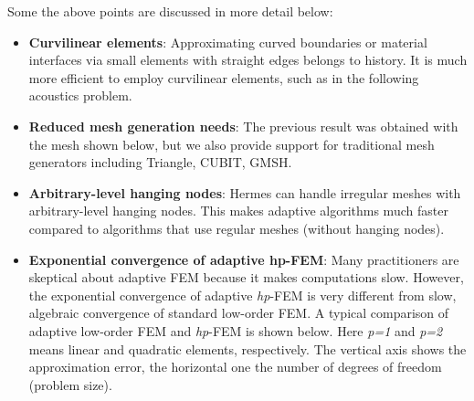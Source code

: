 \documentclass[a4paper,0pt,english]{sphinxmanual}
\let\origfigure=\figure
\renewenvironment{figure}[6]{
\origfigure[H]}
{\endlist}
\begin{document}
Some the above points are discussed in more detail below:
\begin{itemize}
\item {} 
\textbf{Curvilinear elements}: Approximating curved boundaries or material interfaces via small elements with straight edges belongs to history. It is much more efficient to employ curvilinear elements, such as in the following acoustics problem.

\end{itemize}
\begin{figure}[htbp]
\centering

\end{figure}
\begin{itemize}
\item {} 
\textbf{Reduced mesh generation needs}: The previous result was obtained with the mesh shown below, but we also provide support for traditional mesh generators including Triangle, CUBIT, GMSH.

\end{itemize}
\begin{figure}[htbp]
\centering

\end{figure}
\begin{itemize}
\item {} 
\textbf{Arbitrary-level hanging nodes}: Hermes can handle irregular meshes with arbitrary-level hanging nodes. This makes adaptive algorithms much faster compared to algorithms that use regular meshes (without hanging nodes).

\end{itemize}
\begin{figure}[htbp]
\centering

\end{figure}
\begin{itemize}
\item {} 
\textbf{Exponential convergence of adaptive hp-FEM}: Many practitioners are skeptical about adaptive FEM because it makes computations slow. However, the exponential convergence of adaptive \emph{hp}-FEM is very different from slow, algebraic convergence of standard low-order FEM. A typical comparison of adaptive low-order FEM and \emph{hp}-FEM is shown below. Here \emph{p=1} and \emph{p=2} means linear and quadratic elements, respectively. The vertical axis shows the approximation error, the horizontal one the number of degrees of freedom (problem size).

\end{itemize}
\begin{figure}[htbp]
\centering

\end{figure}
\end{document}
